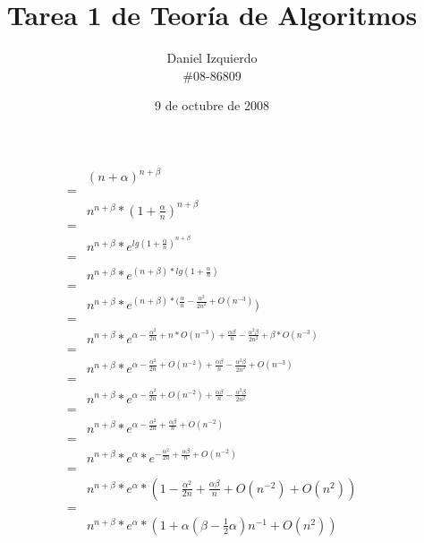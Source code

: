 \documentclass{article}
\begin{document}

\title{Tarea 1 de Teoría de Algoritmos}
\author{Daniel Izquierdo \\ \#08-86809}
\date{9 de octubre de 2008}

\maketitle

\section{}

\begin{align*}
 & (n+\alpha)^{n+\beta} \\
 = & \\
 & n^{n+\beta} * (1+\frac{\alpha}{n})^{n+\beta} \\
 = & \\
 & n^{n+\beta} * e^{lg (1+\frac{\alpha}{n})^{n+\beta}} \\
 = & \\
 & n^{n+\beta} * e^{(n+\beta) * lg (1+\frac{\alpha}{n})} \\
 = & \\
 & n^{n+\beta} * e^{(n+\beta) * (\frac{\alpha}{n} - \frac{\alpha^2}{2n^2}+O(n^{-3})}) \\
 = & \\
 & n^{n+\beta} * e^{\alpha-\frac{\alpha^2}{2n}+n*O(n^{-3})+\frac{\alpha\beta}{n}-\frac{\alpha^2\beta}{2n^2}+\beta*O(n^{-3})} \\
 = & \\
 & n^{n+\beta} * e^{\alpha-\frac{\alpha^2}{2n}+O(n^{-2})+\frac{\alpha\beta}{n}-\frac{\alpha^2\beta}{2n^2}+O(n^{-3})} \\
 = & \\
 & n^{n+\beta} * e^{\alpha-\frac{\alpha^2}{2n}+O(n^{-2})+\frac{\alpha\beta}{n}-\frac{\alpha^2\beta}{2n^2}} \\
 = & \\
 & n^{n+\beta} * e^{\alpha-\frac{\alpha^2}{2n}+\frac{\alpha\beta}{n}+O(n^{-2})} \\
 = & \\
 & n^{n+\beta} * e^{\alpha} * e^{-\frac{\alpha^2}{2n}+\frac{\alpha\beta}{n}+O(n^{-2})} \\
 = & \\
 & n^{n+\beta} * e^{\alpha} * (1-\frac{\alpha^2}{2n}+\frac{\alpha\beta}{n}+O(n^{-2}) + O(n^2)) \\
 = & \\
 & n^{n+\beta} * e^{\alpha} * (1+\alpha(\beta-\frac{1}{2}\alpha)n^{-1}+O(n^{2})) \\
\end{align*}
\end{document}
